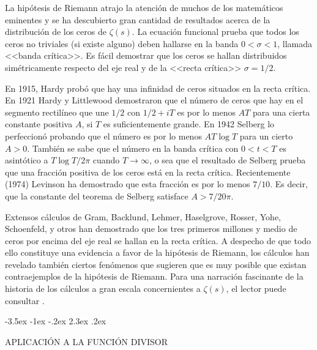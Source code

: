 \documentclass[12pt,a4paper]{book}
\makeatletter
\renewcommand\section{\@startsection{section}{1}{\z@}%
  {-3.5ex \@plus -1ex \@minus -.2ex}%
  {2.3ex \@plus .2ex}%
  {\normalfont\Large\bfseries\raggedright}}
\makeatother
\begin{document}
    La hipótesis de Riemann atrajo la atención de muchos de los matemáticos eminentes y se ha
    descubierto gran cantidad de resultados acerca de la distribución de los ceros de
    $\zeta(s)$. La ecuación funcional prueba que todos los ceros no triviales (si existe
    alguno) deben hallarse en la banda $0<\sigma<1$, llamada <<banda crítica>>. Es fácil
    demostrar que los ceros se hallan distribuidos simétricamente respecto del eje real y de
    la <<recta crítica>> $\sigma=1/2$.

    En 1915, Hardy probó que hay una infinidad de ceros situados en la recta crítica. En 1921
    Hardy y Littlewood demostraron que el número de ceros que hay en el segmento rectilíneo
    que une $1/2$ con $1/2+iT$ es por lo menos $AT$ para una cierta constante positiva $A$,
    si $T$ es suficientemente grande. En 1942 Selberg lo perfeccionó probando que el número es
    por lo menos $AT\log T$ para un cierto $A>0$. También se sabe que el número en la banda
    crítica con $0<t<T$ es asintótico a $T\log T/2\pi$ cuando $T\to\infty$, o sea que el
    resultado de Selberg prueba que una fracción positiva de los ceros está en la recta
    crítica. Recientemente (1974) Levinson \cite{levinson1974} ha demostrado que esta fracción es por lo menos
    $7/10$. Es decir, que la constante del teorema de Selberg satisface $A>7/20\pi$.

    Extensos cálculos de Gram, Backlund, Lehmer, Haselgrove, Rosser, Yohe, Schoenfeld, y otros
    han demostrado que los tres primeros millones y medio de ceros por encima del eje real se
    hallan en la recta crítica. A despecho de que todo ello constituye una evidencia a favor de
    la hipótesis de Riemann, los cálculos han revelado también ciertos fenómenos que sugieren
    que es muy posible que existan contraejemplos de la hipótesis de Riemann. Para una
    narración fascinante de la historia de los cálculos a gran escala concernientes a
    $\zeta(s)$, el lector puede consultar \cite{edwards1974}.

    \section{APLICACIÓN A LA FUNCIÓN DIVISOR}
\end{document}
